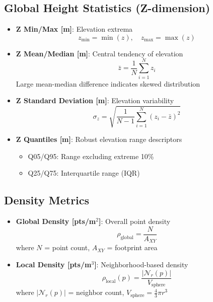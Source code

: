 \documentclass[12pt]{article}
\begin{document}
\subsection{Global Height Statistics (Z-dimension)}
\begin{itemize}
    \item \textbf{Z Min/Max [m]}: Elevation extrema
    \begin{equation}
        z_{\min} = \min(z), \quad z_{\max} = \max(z)
    \end{equation}

    \item \textbf{Z Mean/Median [m]}: Central tendency of elevation
    \begin{equation}
        \bar{z} = \frac{1}{N}\sum_{i=1}^{N} z_i
    \end{equation}
    Large mean-median difference indicates skewed distribution

    \item \textbf{Z Standard Deviation [m]}: Elevation variability
    \begin{equation}
        \sigma_z = \sqrt{\frac{1}{N-1}\sum_{i=1}^{N} (z_i - \bar{z})^2}
    \end{equation}

    \item \textbf{Z Quantiles [m]}: Robust elevation range descriptors
    \begin{itemize}
        \item Q05/Q95: Range excluding extreme 10\%
        \item Q25/Q75: Interquartile range (IQR)
    \end{itemize}
\end{itemize}

\subsection{Density Metrics}
\begin{itemize}
    \item \textbf{Global Density [pts/m$^2$]}: Overall point density
    \begin{equation}
        \rho_{\text{global}} = \frac{N}{A_{XY}}
    \end{equation}
    where $N$ = point count, $A_{XY}$ = footprint area

    \item \textbf{Local Density [pts/m$^3$]}: Neighborhood-based density
    \begin{equation}
        \rho_{\text{local}}(p) = \frac{|\mathcal{N}_r(p)|}{V_{\text{sphere}}}
    \end{equation}
    where $|\mathcal{N}_r(p)|$ = neighbor count, $V_{\text{sphere}} = \frac{4}{3}\pi r^3$
\end{itemize}
\end{document}
